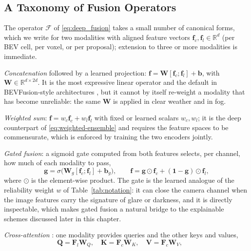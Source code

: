 \subsection{A Taxonomy of Fusion Operators}
\label{subsec:fusion-operators}
The operator $\mathcal{F}$ of \eqref{eq:deep_fusion} takes a small number of canonical forms, which we write for two modalities with aligned feature vectors $\mathbf{f}_c,\mathbf{f}_l\in\mathbb{R}^{d}$ (per BEV cell, per voxel, or per proposal); extension to three or more modalities is immediate.
\begin{list4a}
    \item \emph{Concatenation} followed by a learned projection: $\mathbf{f}=\mathbf{W}[\mathbf{f}_c;\mathbf{f}_l]+\mathbf{b}$, with $\mathbf{W}\in\mathbb{R}^{d\times 2d}$. It is the most expressive linear operator and the default in BEVFusion-style architectures \cite{liu2023_bevfusion}, but it cannot by itself re-weight a modality that has become unreliable: the same $\mathbf{W}$ is applied in clear weather and in fog.
    \item \emph{Weighted sum}: $\mathbf{f}=w_c\mathbf{f}_c+w_l\mathbf{f}_l$ with fixed or learned scalars $w_c,w_l$; it is the deep counterpart of \eqref{eq:weighted-ensemble} and requires the feature spaces to be commensurate, which is enforced by training the two encoders jointly.
    \item \emph{Gated fusion}: a sigmoid gate computed from both features selects, per channel, how much of each modality to pass,
    \begin{equation}
    \mathbf{g}=\sigma\!\big(\mathbf{W}_g[\mathbf{f}_c;\mathbf{f}_l]+\mathbf{b}_g\big),\qquad
    \mathbf{f}=\mathbf{g}\odot\mathbf{f}_c+(\mathbf{1}-\mathbf{g})\odot\mathbf{f}_l ,
    \label{eq:gated-fusion}
    \end{equation}
    where $\odot$ is the element-wise product. The gate is the learned analogue of the reliability weight $w$ of Table~\ref{tab:notation}: it can close the camera channel when the image features carry the signature of glare or darkness, and it is directly inspectable, which makes gated fusion a natural bridge to the explainable schemes discussed later in this chapter.
    \item \emph{Cross-attention} \cite{vaswani2017_attention}: one modality provides queries and the other keys and values,
    \begin{equation}
    \mathbf{Q}=\mathbf{F}_l\mathbf{W}_Q,\quad \mathbf{K}=\mathbf{F}_c\mathbf{W}_K,\quad \mathbf{V}=\mathbf{F}_c\mathbf{W}_V,\qquad

\end{equation}
\end{list4a}
